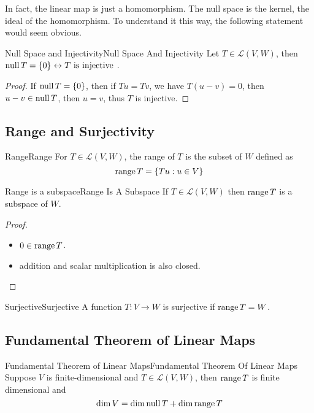 \documentclass[../main.tex]{subfiles}
\begin{document}
\begin{remark}
In fact, the linear map is just a homomorphism. The null space is the kernel, the ideal of the homomorphism. To understand it this way, the following statement would seem obvious.
\end{remark}

\begin{theorem}{Null Space and Injectivity}{Null Space And Injectivity}
Let $T\in \mathscr{L}(V,W)$, then $\operatorname{null} T = \left\{ 0 \right\} \leftrightarrow T \text{ is injective }$.
\end{theorem}
\begin{proof}
If $\operatorname{null} T = \left\{ 0 \right\}$, then if $Tu=Tv$, we have  $T(u-v)=0$, then $u-v\in \operatorname{null} T$, then  $u=v$, thus  $T$ is injective.
\end{proof}

\subsection{Range and Surjectivity}
\begin{definition}{Range}{Range}
For $T\in \mathscr{L}(V,W)$, the range of $T$ is the subset of $W$ defined as
\begin{equation}
\operatorname{range} T = \left\{ Tu:u\in V \right\}
\end{equation}
\end{definition}
\begin{theorem}{Range is a subspace}{Range Is A Subspace}
If $T\in \mathscr{L}(V,W)$ then $\operatorname{range} T$ is a subspace of $W$.
\end{theorem}
\begin{proof}
\begin{itemize}
\item $0\in \operatorname{range} T$.
\item addition and scalar multiplication is also closed.
\end{itemize}
\end{proof}

\begin{definition}{Surjective}{Surjective}
A function $T:V \rightarrow  W$ is surjective if $\operatorname{range} T = W$.
\end{definition}

\subsection{Fundamental Theorem of Linear Maps}
\begin{theorem}{Fundamental Theorem of Linear Maps}{Fundamental Theorem Of Linear Maps}
Suppose $V$ is finite-dimensional and $T\in \mathscr{L}(V,W)$, then $\operatorname{range} T$ is finite dimensional and
\begin{equation}
\dim V = \dim \operatorname{null} T + \dim \operatorname{range} T
\end{equation}
\end{theorem}
\end{document}
